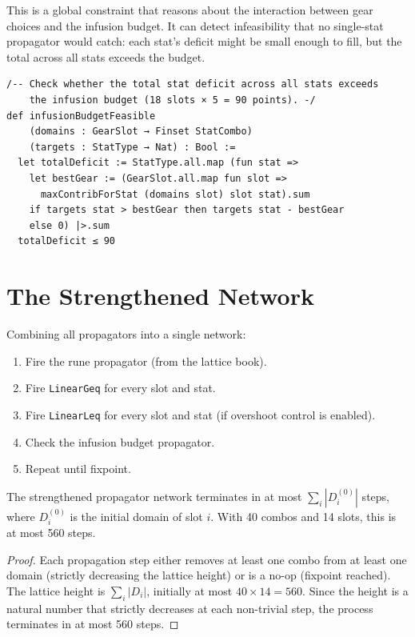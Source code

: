 \documentclass[11pt, a4paper, oneside]{book}
\begin{document}
This is a global constraint that reasons about the interaction between gear
choices and the infusion budget.  It can detect infeasibility that no
single-stat propagator would catch: each stat's deficit might be small
enough to fill, but the total across all stats exceeds the budget.

\begin{leanbox}[title={Lean 4 (Mathlib) --- Infusion Budget Propagator}]
\begin{verbatim}
/-- Check whether the total stat deficit across all stats exceeds
    the infusion budget (18 slots × 5 = 90 points). -/
def infusionBudgetFeasible
    (domains : GearSlot → Finset StatCombo)
    (targets : StatType → Nat) : Bool :=
  let totalDeficit := StatType.all.map (fun stat =>
    let bestGear := (GearSlot.all.map fun slot =>
      maxContribForStat (domains slot) slot stat).sum
    if targets stat > bestGear then targets stat - bestGear
    else 0) |>.sum
  totalDeficit ≤ 90
\end{verbatim}
\end{leanbox}

\section{The Strengthened Network}

Combining all propagators into a single network:

\begin{enumerate}[nosep]
  \item Fire the rune propagator (from the lattice book).
  \item Fire \texttt{LinearGeq} for every slot and stat.
  \item Fire \texttt{LinearLeq} for every slot and stat (if overshoot control
    is enabled).
  \item Check the infusion budget propagator.
  \item Repeat until fixpoint.
\end{enumerate}

\begin{thmbox}[title={Termination of the Strengthened Network}]
The strengthened propagator network terminates in at most
$\sum_i |D_i^{(0)}|$ steps, where $D_i^{(0)}$ is the initial domain
of slot $i$.  With 40 combos and 14 slots, this is at most 560 steps.
\end{thmbox}

\begin{proof}
Each propagation step either removes at least one combo from at least one
domain (strictly decreasing the lattice height) or is a no-op (fixpoint
reached).  The lattice height is $\sum_i |D_i|$, initially at most
$40 \times 14 = 560$.  Since the height is a natural number that strictly
decreases at each non-trivial step, the process terminates in at most
560 steps.
\end{proof}
\end{document}
